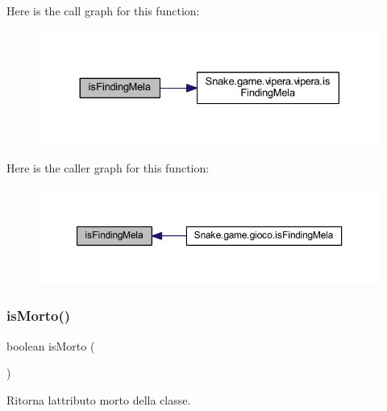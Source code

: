 Here is the call graph for this function\+:
\nopagebreak
\begin{figure}[H]
\begin{center}
\leavevmode
\includegraphics[width=330pt]{class_snake_1_1game_1_1utility_1_1game_manager_ad36cea66da3e5e8f3a9fdd8decd6f70b_cgraph}
\end{center}
\end{figure}
Here is the caller graph for this function\+:
\nopagebreak
\begin{figure}[H]
\begin{center}
\leavevmode
\includegraphics[width=350pt]{class_snake_1_1game_1_1utility_1_1game_manager_ad36cea66da3e5e8f3a9fdd8decd6f70b_icgraph}
\end{center}
\end{figure}
\mbox{\label{class_snake_1_1game_1_1utility_1_1game_manager_aa90b60b508f662fce93e3e8250b2c304}} 
\subsubsection{\texorpdfstring{is\+Morto()}{isMorto()}}
{\footnotesize\ttfamily boolean is\+Morto (\begin{DoxyParamCaption}{ }\end{DoxyParamCaption})}



Ritorna l\textquotesingle{}attributo morto della classe. 



